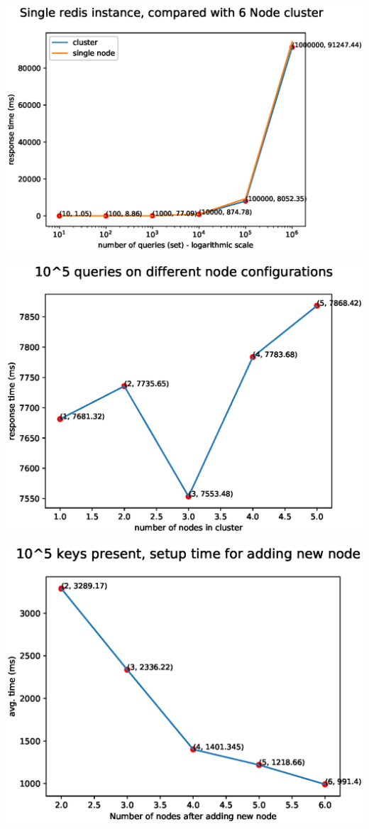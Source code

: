\documentclass{beamer}
\begin{document}
\begin{frame}
    \includegraphics[width=\textwidth]{fig5.eps}
\end{frame}
    
\begin{frame}
    \includegraphics[width=\textwidth]{fig6.eps}
\end{frame}

\begin{frame}
    \includegraphics[width=\textwidth]{fig7.eps}
\end{frame}
\end{document}
